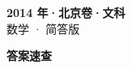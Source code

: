 \documentclass[zihao=-4, a4paper]{ctexart}
\begin{document}
\begin{center}
  {\Large\bfseries 2014 年·北京卷·文科}\\[4pt]
  {\large 数学 · 简答版}
\end{center}
\medskip
{}

\clearpage
{}
\begin{center}{\Large\bfseries 答案速查}\end{center}
\medskip

\end{document}
